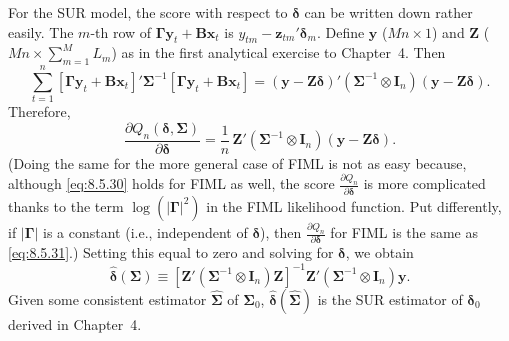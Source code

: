 For the SUR model, the score with respect to $\boldsymbol{\delta}$ can be written down rather
easily. The $m$-th row of $\boldsymbol{\Gamma}\mathbf{y}_t + \mathbf{B}\mathbf{x}_t$ is
$y_{tm} - \mathbf{z}_{tm}'\boldsymbol{\delta}_m$. Define
$\mathbf{y}$ ($Mn \times 1$) and $\mathbf{Z}$
($Mn \times \sum_{m=1}^{M} L_m$) as in the first analytical exercise to Chapter~4. Then
\begin{equation}
  \sum_{t=1}^{n}
    [\boldsymbol{\Gamma}\mathbf{y}_t + \mathbf{B}\mathbf{x}_t]'
    \boldsymbol{\Sigma}^{-1}
    [\boldsymbol{\Gamma}\mathbf{y}_t + \mathbf{B}\mathbf{x}_t]
  = (\mathbf{y} - \mathbf{Z}\boldsymbol{\delta})'
    (\boldsymbol{\Sigma}^{-1} \otimes \mathbf{I}_n)
    (\mathbf{y} - \mathbf{Z}\boldsymbol{\delta}).
  \label{eq:8.5.30} \tag{8.5.30}
\end{equation}
Therefore,
\begin{equation}
  \frac{\partial Q_n(\boldsymbol{\delta}, \boldsymbol{\Sigma})}{\partial \boldsymbol{\delta}}
  = \frac{1}{n}\,\mathbf{Z}'(\boldsymbol{\Sigma}^{-1} \otimes \mathbf{I}_n)
    (\mathbf{y} - \mathbf{Z}\boldsymbol{\delta}).
  \label{eq:8.5.31} \tag{8.5.31}
\end{equation}
(Doing the same for the more general case of FIML is not as easy because, although
\eqref{eq:8.5.30} holds for FIML as well, the score $\frac{\partial Q_n}{\partial \boldsymbol{\delta}}$ is more complicated thanks to the
term $\log(|\boldsymbol{\Gamma}|^2)$ in the FIML likelihood function. Put differently, if $|\boldsymbol{\Gamma}|$ is a constant
(i.e., independent of $\boldsymbol{\delta}$), then $\frac{\partial Q_n}{\partial \boldsymbol{\delta}}$ for FIML is the same as \eqref{eq:8.5.31}.)
Setting this
equal to zero and solving for $\boldsymbol{\delta}$, we obtain
\begin{equation}
  \hat{\boldsymbol{\delta}}(\boldsymbol{\Sigma})
  \equiv [\mathbf{Z}'(\boldsymbol{\Sigma}^{-1} \otimes \mathbf{I}_n)\mathbf{Z}]^{-1}
    \mathbf{Z}'(\boldsymbol{\Sigma}^{-1} \otimes \mathbf{I}_n)\mathbf{y}.
  \label{eq:8.5.32} \tag{8.5.32}
\end{equation}
Given some consistent estimator $\hat{\boldsymbol{\Sigma}}$ of $\boldsymbol{\Sigma}_0$,
$\hat{\boldsymbol{\delta}}(\hat{\boldsymbol{\Sigma}})$ is the SUR estimator of $\boldsymbol{\delta}_0$ derived
in Chapter~4.

